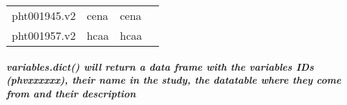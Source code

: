 \documentclass[11pt]{article}
\begin{document}
\begin{tabular}{r|lll}
	 pht001945.v2                                                                                                                                                                                                                                                                                                                                                                                           & cena                                                                                                                                                                                                                                                                                                                                                                                                   & cena                                                                                                                                                                                                                                                                                                                                                                                                  \\
	 pht001957.v2                                                                                                                                                                                                                                                                                                                                                                                           & hcaa                                                                                                                                                                                                                                                                                                                                                                                                   & hcaa                                                                                                                                                                                                                                                                                                                                                                                                  \\
\end{tabular}


    
    \hypertarget{variables.dict-will-return-a-data-frame-with-the-variables-ids-phvxxxxxx-their-name-in-the-study-the-datatable-where-they-come-from-and-their-description}{%
\subparagraph{variables.dict() will return a data frame with the
variables IDs (phvxxxxxx), their name in the study, the datatable where
they come from and their
description}\label{variables.dict-will-return-a-data-frame-with-the-variables-ids-phvxxxxxx-their-name-in-the-study-the-datatable-where-they-come-from-and-their-description}}
\end{document}
